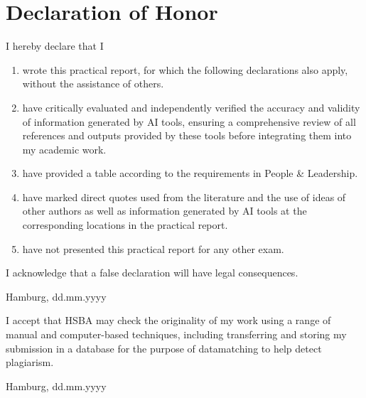 \section*{Declaration of Honor}

I hereby declare that I 
\begin{enumerate}
    \item wrote this practical report, for which the following declarations also apply, without the assistance of others.
    \item have critically evaluated and independently verified the accuracy and validity of information generated by AI tools, ensuring a comprehensive review of all references and outputs provided by these tools before integrating them into my academic work.
    \item have provided a table according to the requirements in People \& Leadership. 
    \item have marked direct quotes used from the literature and the use of ideas of other authors as well as information generated by AI tools at the corresponding locations in the practical report. 
    \item have not presented this practical report for any other exam.
\end{enumerate}

\noindent I acknowledge that a false declaration will have legal consequences. 
 
\begin{figure}
    \centering
\end{figure}
\vspace{3cm}
\noindent Hamburg, dd.mm.yyyy 
\newpage

\noindent I accept that HSBA may check the originality of my work using a range of manual and computer-based techniques, including transferring and storing my submission in a database for the purpose of datamatching to help detect plagiarism. \par
\vspace{3cm}
\noindent Hamburg, dd.mm.yyyy

